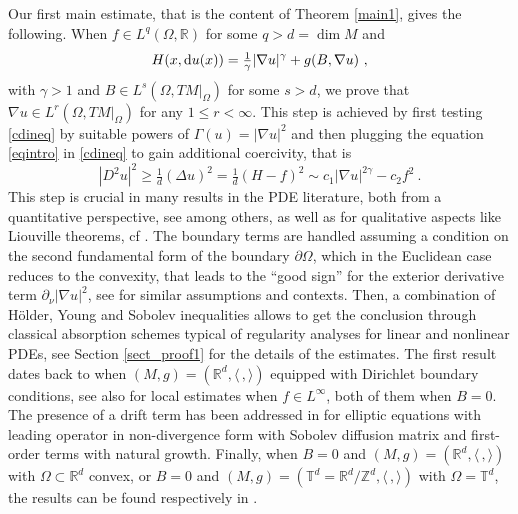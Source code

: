 \documentclass[10pt, a4paper, reqno, oneside]{amsart}
\theoremstyle{plain}
\theoremstyle{definition}
\theoremstyle{plain}
\theoremstyle{definition}
\theoremstyle{plain}
\renewcommand{\=}{:=}
\begin{document}
Our first main estimate, that is the content of Theorem \ref{main1}, gives the following. When $f \in L^q(\Omega,\mathbb{R})$ for some $q>d = \dim M$ and
$$
H(x,{\rm d}u(x))=\tfrac1\gamma|\nabla u|^\gamma+g(B,\nabla u) \,\, ,
$$
with $\gamma>1$ and $B \in L^s(\Omega,TM|_{\Omega})$ for some $s>d$, we prove that $\nabla u \in L^r(\Omega,TM|_{\Omega})$ for any $1 \leq r < \infty$. This step is achieved by first testing \eqref{cdineq} by suitable powers of $\Gamma(u)=|\nabla u|^2$ and then plugging the equation \eqref{eqintro} in \eqref{cdineq} to gain additional coercivity, that is
$$
|D^2u|^2 \geq \tfrac1d(\Delta u)^2 = \tfrac1d(H-f)^2\sim c_1|\nabla u|^{2\gamma}-c_2f^2\ .
$$
This step is crucial in many results in the PDE literature, both from a quantitative perspective, see \cite{Lions85,ll,CirantJMPA,PorLeo} among others, as well as for qualitative aspects like Liouville theorems, cf \cite{SerrinPeletier,Lions85,VeronBook}. 
The boundary terms are handled assuming a condition on the second fundamental form of the boundary $\partial \Omega$, which in the Euclidean case reduces to the convexity, that leads to the ``good sign'' for the exterior derivative term $\partial_\nu|\nabla u|^2$, see \cite{Lio80,CirantJMPA,PorrCCM} for similar assumptions and contexts. Then, a combination of H\"older, Young and Sobolev inequalities allows to get the conclusion through classical absorption schemes typical of regularity analyses for linear and nonlinear PDEs, see Section \ref{sect_proof1} for the details of the estimates. The first result dates back to \cite{Lions85} when $(M,g) = (\mathbb{R}^d,\langle\,,\rangle)$ equipped with Dirichlet boundary conditions, see also \cite{ll} for local estimates when $f\in L^\infty$, both of them when $B=0$. The presence of a drift term has been addressed in \cite{BardiPerthame} for elliptic equations with leading operator in non-divergence form with Sobolev diffusion matrix and first-order terms with natural growth. Finally, when $B=0$ and $(M,g) = (\mathbb{R}^d,\langle\,,\rangle)$ with $\Omega \subset \mathbb{R}^d$ convex, or $B=0$ and $(M,g) = (\mathbb{T}^d = \mathbb{R}^d/\mathbb{Z}^d, \langle\,,\rangle)$ with $\Omega = \mathbb{T}^d$, the results can be found respectively in \cite{CirantJMPA,PV}. \smallskip
\end{document}
